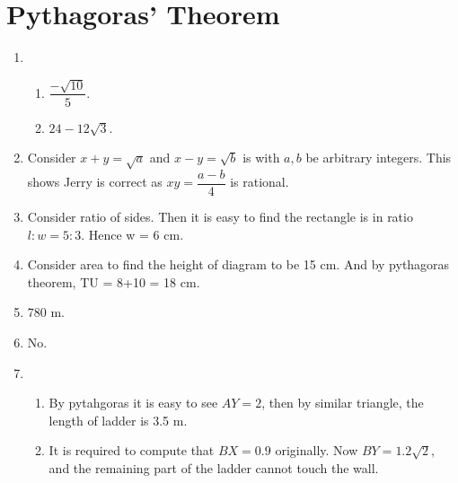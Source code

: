 \documentclass[12pt]{article}
\begin{document}
    \section{Pythagoras' Theorem}
    \begin{enumerate}
        \item \begin{enumerate}
            \item $\dfrac{-\sqrt{10}}{5}$.
            \item $24-12\sqrt{3}$.
        \end{enumerate}
        \item Consider $x+y=\sqrt{a}$ and $x-y=\sqrt{b}$ is with $a,b$ be arbitrary integers. This shows Jerry is correct as $xy=\dfrac{a-b}{4}$ is rational.
        \item Consider ratio of sides. Then it is easy to find the rectangle is in ratio $l:w=5:3$. Hence w = 6 cm.
        \item Consider area to find the height of diagram to be 15 cm. And by pythagoras theorem, TU = 8+10 = 18 cm.
        \item 780 m.
        \item No.
        \item \begin{enumerate}
            \item By pytahgoras it is easy to see $AY=2$, then by similar triangle, the length of ladder is 3.5 m.
            \item It is required to compute that $BX = 0.9$ originally. Now $BY = 1.2\sqrt{2}$, and the remaining part of the ladder cannot touch the wall.
        \end{enumerate}
    \end{enumerate}

    \newpage
\end{document}
